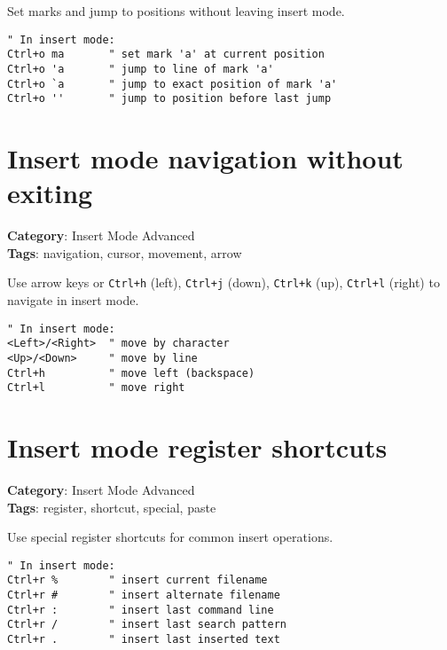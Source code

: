 {{{{{{Set marks and jump to positions without leaving insert mode.

\begin{Exa*}{}
\begin{Verbatim}[fontsize=\footnotesize, breaklines, breakanywhere]
" In insert mode:
Ctrl+o ma       " set mark 'a' at current position
Ctrl+o 'a       " jump to line of mark 'a'
Ctrl+o `a       " jump to exact position of mark 'a'
Ctrl+o ''       " jump to position before last jump
\end{Verbatim}
\end{Exa*}

\section{Insert mode navigation without exiting}

\textbf{Category}: Insert Mode Advanced\\ \textbf{Tags}: navigation, cursor, movement, arrow
\vspace{0.5cm}

Use arrow keys or {\footnotesize \Verb§Ctrl+h§} (left), {\footnotesize \Verb§Ctrl+j§} (down), {\footnotesize \Verb§Ctrl+k§} (up), {\footnotesize \Verb§Ctrl+l§} (right) to navigate in insert mode.

\begin{Exa*}{}
\begin{Verbatim}[fontsize=\footnotesize, breaklines, breakanywhere]
" In insert mode:
<Left>/<Right>  " move by character
<Up>/<Down>     " move by line
Ctrl+h          " move left (backspace)
Ctrl+l          " move right
\end{Verbatim}
\end{Exa*}

\section{Insert mode register shortcuts}

\textbf{Category}: Insert Mode Advanced\\ \textbf{Tags}: register, shortcut, special, paste
\vspace{0.5cm}

Use special register shortcuts for common insert operations.

\begin{Exa*}{}
\begin{Verbatim}[fontsize=\footnotesize, breaklines, breakanywhere]
" In insert mode:
Ctrl+r %        " insert current filename
Ctrl+r #        " insert alternate filename
Ctrl+r :        " insert last command line
Ctrl+r /        " insert last search pattern
Ctrl+r .        " insert last inserted text
\end{Verbatim}
\end{Exa*}

}}}}}}
